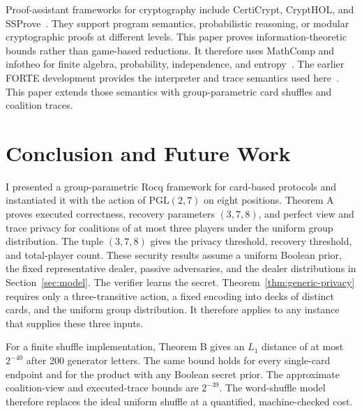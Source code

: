\documentclass[runningheads]{llncs}
\newcommand{\Rocq}{Rocq}
\newcommand{\PG}{\mathrm{PGL}(2,7)}
\begin{document}
Proof-assistant frameworks for cryptography include CertiCrypt, CryptHOL, and
SSProve~\cite{CertiCrypt,CryptHOL,SSProve}. They support program semantics,
probabilistic reasoning, or modular cryptographic proofs at different levels.
This paper proves information-theoretic bounds rather than game-based
reductions. It therefore uses MathComp and infotheo for finite algebra,
probability, independence, and entropy~\cite{MathComp,InfoTheo}. The earlier
FORTE development provides the interpreter and trace semantics used
here~\cite{WengEtAl2025}. This paper extends those semantics with
group-parametric card shuffles and coalition traces.

\section{Conclusion and Future Work}\label{sec:conclusion}

I presented a group-parametric \Rocq{} framework for card-based protocols and
instantiated it with the action of $\PG$ on eight positions. Theorem A proves
executed correctness, recovery parameters $(3,7,8)$, and perfect view and
trace privacy for coalitions of at most three players under the uniform group
distribution. The tuple $(3,7,8)$ gives the privacy threshold, recovery
threshold, and total-player count. These security results assume a uniform
Boolean prior, the fixed representative dealer, passive adversaries, and the
dealer distributions in Section~\ref{sec:model}. The verifier learns the
secret. Theorem~\ref{thm:generic-privacy} requires only a three-transitive
action, a fixed encoding into decks of distinct cards, and the uniform group
distribution. It therefore applies to any instance that supplies these three
inputs.

For a finite shuffle implementation, Theorem B gives an $L_1$ distance of at
most $2^{-40}$ after 200 generator letters. The same bound holds for every
single-card endpoint and for the product with any Boolean secret prior. The
approximate coalition-view and executed-trace bounds are $2^{-39}$. The
word-shuffle model therefore replaces the ideal uniform shuffle at a
quantified, machine-checked cost.
\end{document}
